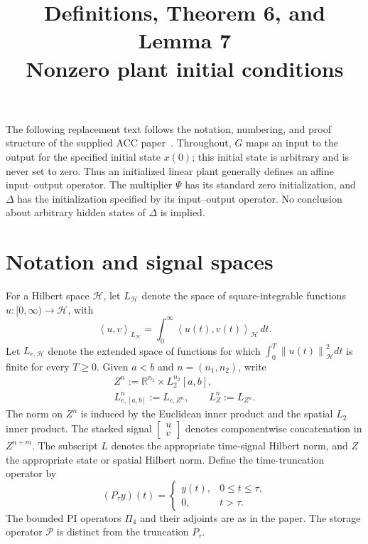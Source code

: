 \documentclass[10pt,twocolumn,letterpaper]{article}
\title{\large Definitions, Theorem 6, and Lemma 7\\
\normalsize Nonzero plant initial conditions}
\author{}
\date{}
\theoremstyle{definition}
\theoremstyle{plain}
\newcommand{\col}[1]{\begin{bmatrix}#1\end{bmatrix}}
\newcommand{\ip}[2]{\left\langle #1,#2\right\rangle}
\newcommand{\norm}[1]{\left\lVert #1\right\rVert}
\newcommand{\opP}{\mathcal P}
\begin{document}
\maketitle
\noindent
The following replacement text follows the notation, numbering, and proof
structure of the supplied ACC paper~\cite{channels}. Throughout, $G$ maps
an input to the output for the specified initial state $x(0)$; this initial
state is arbitrary and is never set to zero. Thus an initialized linear
plant generally defines an affine input--output operator. The multiplier
$\Psi$ has its standard zero initialization, and $\Delta$ has the
initialization specified by its input--output operator. No conclusion
about arbitrary hidden states of $\Delta$ is implied.

\section*{Notation and signal spaces}

For a Hilbert space $\mathcal H$, let $L_{\mathcal H}$ denote the space
of square-integrable functions $u:[0,\infty)\to\mathcal H$, with
\[
 \ip{u}{v}_{L_{\mathcal H}}
 =\int_0^\infty\ip{u(t)}{v(t)}_{\mathcal H}\,dt.
\]
Let $L_{e,\mathcal H}$ denote the extended space of functions for which
$\int_0^T\norm{u(t)}_{\mathcal H}^2dt$ is finite for every $T\geq0$.
Given $a<b$ and $n=(n_1,n_2)$, write
\[
 \begin{gathered}
 Z^n:=\mathbb R^{n_1}\times L_2^{n_2}[a,b],\\
 L^n_{e,[a,b]}:=L_{e,Z^n},\qquad L^n_Z:=L_{Z^n}.
 \end{gathered}
\]
The norm on $Z^n$ is induced by the Euclidean inner product and the
spatial $L_2$ inner product. The stacked signal $\col{u\\v}$ denotes
componentwise concatenation in $Z^{n+m}$. The subscript $L$ denotes the
appropriate time-signal Hilbert norm, and $Z$ the appropriate state or
spatial Hilbert norm. Define the time-truncation operator by
\[
 (P_\tau y)(t)=
 \begin{cases}y(t),&0\leq t\leq\tau,\\0,&t>\tau.\end{cases}
\]
The bounded PI operators $\Pi_4$ and their adjoints are as in the paper.
The storage operator $\opP$ is distinct from the truncation $P_\tau$.
\end{document}
